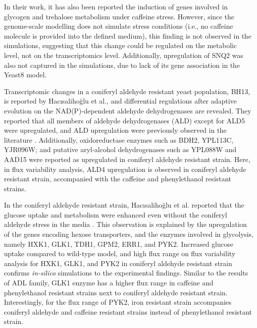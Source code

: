 In their work, it has also been reported the induction of genes involved in glycogen and trehalose metabolism under caffeine stress. However, since the genome-scale modelling does not simulate stress conditions (i.e., no caffeine molecule is provided into the defined medium), this finding is not observed in the simulations, suggesting that this change could be regulated on the metabolic level, not on the transcriptomics level. Additionally, upregulation of SNQ2 was also not captured in the simulations, due to lack of its gene association in the Yeast8 model.

Transcriptomic changes in a coniferyl aldehyde resistant yeast population, BH13, is reported by Hacısalihoğlu et al., and differential regulations after adaptive evolution on the NAD(P)-dependent aldehyde dehydrogenases are revealed. They reported that all members of aldehyde dehydrogenases (ALD) except for ALD5 were upregulated, and ALD upregulation were previously observed in the literature \cite{adeboye2015catabolism}. Additionally, oxidoreductase enzymes such as BDH2, YPL113C, YJR096W; and putative aryl-alcohol dehydrogenases such as YPL088W and AAD15 were reported as upregulated in coniferyl aldehyde resistant strain. Here, in flux variability analysis, ALD4 upregulation is observed in coniferyl aldehyde resistant strain, accompanied with the caffeine and phenylethanol resistant strains.

In the coniferyl aldehyde resistant strain, Hacısalihoğlu et al. reported that the glucose uptake and metabolism were enhanced even without the coniferyl aldehyde stress in the media \cite{Hacsaliholu2019}. This observation is explained by the upregulation of the genes encoding hexose transporters, and the enzymes involved in glycolysis, namely HXK1, GLK1, TDH1, GPM2, ERR1, and PYK2. Increased glucose uptake compared to wild-type model, and high flux range on flux variability analysis for HXK1, GLK1, and PYK2 in coniferyl aldehyde resistant strain confirms \emph{in-silico} simulations to the experimental findings. Similar to the results of ADL family, GLK1 enzyme has a higher flux range in caffeine and phenylethanol resistant strains next to coniferyl aldehyde resistant strain. Interestingly, for the flux range of PYK2, iron resistant strain accompanies coniferyl aldehyde and caffeine resistant strains instead of phenylethanol resistant strain.


